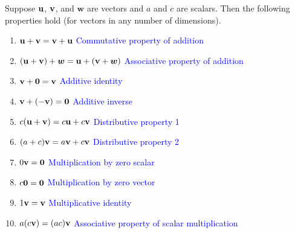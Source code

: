 \documentclass[../mathNotesPreamble]{subfiles}
\begin{document}
  \begin{thmBox*}
    Suppose ${\mathbf{u}}$, ${\mathbf{v}}$, and $\bm{w}$ are vectors and $a$ and $c$ are scalars. Then the following properties hold (for vectors in any number of dimensions).
    \begin{center}
      \begin{minipage}{0.925\linewidth}
        \begin{enumerate}
          \item 
            ${\mathbf{u}}+{\mathbf{v}}={\mathbf{v}}+{\mathbf{u}}$ 
            \tab \textcolor{blue}{Commutative property of addition}
          \item 
            ${\left({\mathbf{u}}+{\mathbf{v}}\right)}+\bm w={\mathbf{u}}+{\left({\mathbf{v}}+\bm w\right)}$
            \tab \textcolor{blue}{Associative property of addition}
          \item 
            ${\mathbf{v}}+\mathbf{0}={\mathbf{v}}$
            \tab \textcolor{blue}{Additive identity}
          \item 
            ${\mathbf{v}}+{\left(-{\mathbf{v}}\right)}=\mathbf{0}$
            \tab \textcolor{blue}{Additive inverse}
          \item 
            $c{\left({\mathbf{u}}+{\mathbf{v}}\right)}=c{\mathbf{u}}+c{\mathbf{v}}$
            \tab \textcolor{blue}{Distributive property 1}
          \item 
            ${\left(a+c\right)}{\mathbf{v}}=a{\mathbf{v}}+c{\mathbf{v}}$
            \tab \textcolor{blue}{Distributive property 2}
          \item 
            $0{\mathbf{v}}=\mathbf{0}$
            \tab \textcolor{blue}{Multiplication by zero scalar}
          \item 
            $c\mathbf{0}=\mathbf{0}$
            \tab \textcolor{blue}{Multiplication by zero vector}
          \item 
            $1{\mathbf{v}}={\mathbf{v}}$
            \tab \textcolor{blue}{Multiplicative identity}
          \item 
            $a{\left(c{\mathbf{v}}\right)}={\left(ac\right)}{\mathbf{v}}$
            \tab \textcolor{blue}{Associative property of scalar multiplication}
        \end{enumerate}
      \end{minipage}
    \end{center}
  \end{thmBox*}
  \pagebreak
\end{document}
